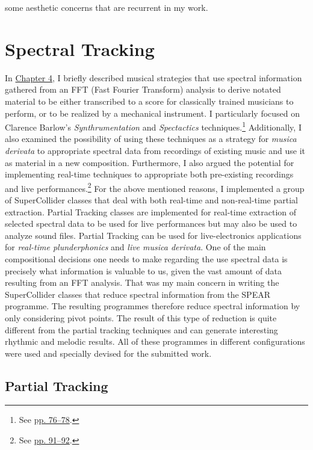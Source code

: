 some aesthetic concerns that are recurrent in my work.

\hypertarget{spectrack}{}
\section{Spectral Tracking}

In \hyperlink{chapter4}{Chapter 4}, I briefly described musical strategies that use spectral information gathered from an FFT (Fast Fourier Transform) analysis to derive notated material to be either transcribed to a score for classically trained musicians to perform, or to be realized by a mechanical instrument. I particularly focused on Clarence Barlow's \emph{Synthrumentation} and \emph{Spectactics} techniques.\footnote{See \hyperlink{spectactics}{pp. 76--78}.} Additionally, I also examined the possibility of using these techniques as a strategy for \emph{musica derivata} to appropriate spectral data from recordings of existing music and use it as material in a new composition. Furthermore, I also argued the potential for implementing real-time techniques to appropriate both pre-existing recordings and live performances.\footnote{See \hyperlink{realtimeplunderfuck}{pp. 91--92}.} For the above mentioned reasons, I implemented a group of SuperCollider classes that deal with both real-time and non-real-time partial extraction. Partial Tracking classes are implemented for real-time extraction of selected spectral data to be used for live performances but may also be used to analyze sound files. Partial Tracking can be used for live-electronics applications for \emph{real-time plunderphonics} and \emph{live musica derivata}. One of the main compositional decisions one needs to make regarding the use spectral data is precisely what information is valuable to us, given the vast amount of data resulting from an FFT analysis. That was my main concern in writing the SuperCollider classes that reduce spectral information from the SPEAR programme. The resulting programmes therefore reduce spectral information by only considering pivot points. The result of this type of reduction is quite different from the partial tracking techniques and can generate interesting rhythmic and melodic results. All of these programmes in different configurations were used and specially devised for the submitted work. 

\subsection{Partial Tracking}

